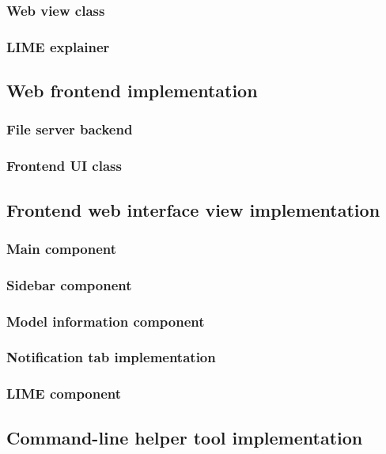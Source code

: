 \documentclass[
    bindingoffset=5mm,  %
    footnoteindent=3mm, %
    hyphenation=true    %
]{src/wut-thesis}
\begin{document}
\subsubsection{Web view class}
\subsubsection{LIME explainer}

\subsection{Web frontend implementation}
\subsubsection{File server backend}
\subsubsection{Frontend UI class}

\subsection{Frontend web interface view implementation}
\subsubsection{Main component}
\subsubsection{Sidebar component}
\subsubsection{Model information component}
\subsubsection{Notification tab implementation}
\subsubsection{LIME component}

\subsection{Command-line helper tool implementation}

%
%
\clearpage %
\end{document}
